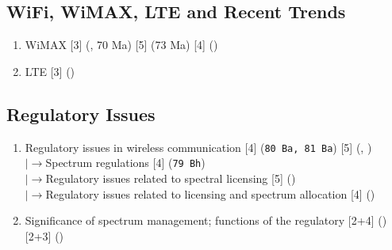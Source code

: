 \documentclass[12pt]{article}
\newcommand{\lb}{\\$\left|\rightarrow\right.$}
\begin{document}
  \subsection{WiFi, WiMAX, LTE and Recent Trends}
    \begin{enumerate}[topsep=0pt, noitemsep]
      \item WiMAX \hfill [3] (, 70 Ma) [5] (73 Ma) [4] ()
      \item LTE \hfill [3] ()
    \end{enumerate}

  \subsection{Regulatory Issues}
    \begin{enumerate}[topsep=0pt, noitemsep]
      \item Regulatory issues in wireless communication \hfill [4] (\texttt{80 Ba, 81 Ba}) [5] (, )
        \lb Spectrum regulations \hfill [4] (\texttt{79 Bh})
        \lb Regulatory issues related to spectral licensing \hfill [5] ()
        \lb Regulatory issues related to licensing and spectrum allocation \hfill [4] ()
      \item Significance of spectrum management; functions of the regulatory
        \hfill [2+4] () [2+3] ()
    \end{enumerate}
\end{document}
